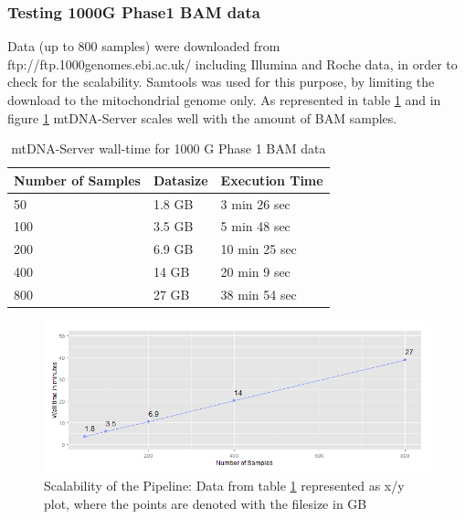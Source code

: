 \subsubsection{Testing 1000G Phase1 BAM data}	
Data (up to 800 samples) were downloaded from ftp://ftp.1000genomes.ebi.ac.uk/ including Illumina and Roche data, in order to check for the scalability. Samtools was used for this purpose, by limiting the download to the mitochondrial genome only. As represented in table \ref{table:bam} and in figure \ref{fig:scalability} mtDNA-Server scales well with the amount of BAM samples. 
\begin{table}[h]
\centering
\caption{ mtDNA-Server wall-time for 1000 G Phase 1 BAM data}
\label{table:bam}
\begin{tabular}{lll}
Number of Samples  &  Datasize & Execution Time \\
\hline
50 &   1.8 GB &  3 min 26 sec\\
100 &  3.5 GB &  5 min 48 sec  \\
200 &  6.9 GB &  10 min 25 sec  \\
400 & 14 GB &  20 min 9 sec \\
800 & 27 GB & 38 min 54 sec
\end{tabular}
\end{table}

\begin{figure}[!ht]
    \centering
    \includegraphics[width=1\textwidth]{images/scalability.png}
    \caption[Scalability of the mtDNA-Server pipeline]{Scalability of the Pipeline: Data from table \ref{table:bam} represented as x/y plot, where the points are denoted with the filesize in GB} 
    \label{fig:scalability}
\end{figure}

